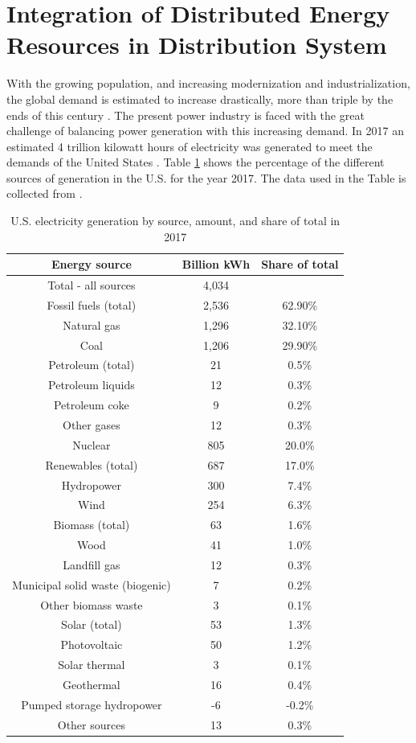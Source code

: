 \section{Integration of Distributed Energy Resources in Distribution System}
With the growing population, and increasing modernization and industrialization, the global demand is estimated to increase drastically, more than triple by the ends of this century \cite{INTRO1}. The present power industry is faced with the great challenge of balancing power generation with this increasing demand. In 2017 an estimated 4 trillion kilowatt hours of electricity was generated to meet the demands of the United States \cite{EIA2018}. Table \ref{tab:IN1} shows the percentage of the different sources of generation in the U.S. for the year 2017. The data used in the Table is collected from \cite{EIA2018}.

\begin{table}[ht]
\label{tab:IN1}
\caption[U.S. electricity generation by source, amount, and share of total in 2017]{U.S. electricity generation by source, amount, and share of total in 2017 \cite{EIA2018}}
\centering
\begin{tabular}{|c|c|c|}
\hline
Energy source & Billion kWh & Share of total \\ \hline
Total - all sources & 4,034 &  \\ \hline
Fossil fuels (total) & 2,536 & 62.90\% \\ \hline
Natural gas & 1,296 & 32.10\% \\ \hline
Coal & 1,206 & 29.90\% \\ \hline
Petroleum (total) & 21 & 0.5\% \\ \hline
Petroleum liquids & 12 & 0.3\% \\ \hline
Petroleum coke & 9 & 0.2\% \\ \hline
Other gases & 12 & 0.3\% \\ \hline
Nuclear & 805 & 20.0\% \\ \hline
Renewables (total) & 687 & 17.0\% \\ \hline
Hydropower & 300 & 7.4\% \\ \hline
Wind & 254 & 6.3\% \\ \hline
Biomass (total) & 63 & 1.6\% \\ \hline
Wood & 41 & 1.0\% \\ \hline
Landfill gas & 12 & 0.3\% \\ \hline
Municipal solid waste (biogenic) & 7 & 0.2\% \\ \hline
Other biomass waste & 3 & 0.1\% \\ \hline
Solar (total) & 53 & 1.3\% \\ \hline
Photovoltaic & 50 & 1.2\% \\ \hline
Solar thermal & 3 & 0.1\% \\ \hline
Geothermal & 16 & 0.4\% \\ \hline
Pumped storage hydropower & -6 & -0.2\% \\ \hline
Other sources & 13 & 0.3\% \\ \hline
\end{tabular}
\end{table}

